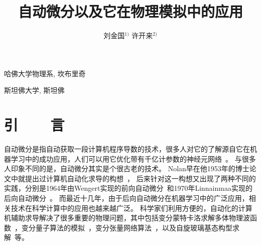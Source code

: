 \documentclass[A4,twoside,UTF8]{ctexart}
\begin{document}
\apsname

\title{自动微分以及它在物理模拟中的应用\fivestar}%

\author{刘金国$^{1)}$ \quad 许开来$^{2)}$}

\address{1)}{哈佛大学物理系, 坎布里奇 }
\address{2)}{斯坦佛大学, 斯坦佛 }





\cfund{}




{}\baselineskip
\section{引~~~~言}
    自动微分是指自动获取一段计算机程序导数的技术，很多人对它的了解源自它在机器学习中的成功应用，人们可以用它优化带有千亿计参数的神经元网络~\cite{Rosset2019}。
与很多人印象不同的是，自动微分其实是个很古老的技术。
Nolan早在他1953年的博士论文中就提出过计算机自动化求导的构想~\cite{Nolan1953}，
后来针对这一构想又出现了两种不同的实践，分别是1964年由Wengert实现的前向自动微分~\cite{Wengert1964}和1970年Linnainmaa实现的后向自动微分~\cite{Linnainmaa1976}。
而最近十几年，由于后向自动微分在机器学习中的广泛应用，相关技术在科学计算中的应用也越来越广泛。
科学家们利用方便的，自动化的计算机辅助求导解决了很多重要的物理问题，其中包括变分蒙特卡洛求解多体物理波函数~\cite{Gutzwiller1963,Carleo2017, Deng2017,Cai2018}，变分量子算法的模拟~\cite{Luo2019}，变分张量网络算法~\cite{Liao2019}，以及自旋玻璃基态构型求解~\cite{Liu2020}等。
\end{document}
